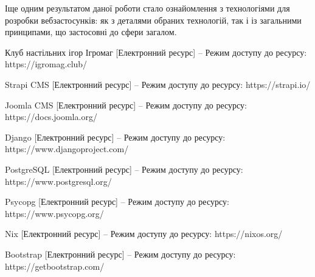 \documentclass[a4paper, 14pt]{extarticle}
\begin{document}
  Іще одним результатом даної роботи стало ознайомлення з технологіями для
  розробки вебзастосунків: як з деталями обраних технологій, так і із загальними принципами,
  що застосовні до сфери загалом.

  \clearpage
  \begin{thebibliography}{9}
     Клуб настільних ігор Ігромаг [Електронний ресурс]
    -- Режим доступу до ресурсу:
    https://igromag.club/

     Strapi CMS [Електронний ресурс] -- Режим доступу до ресурсу:
    https://strapi.io/

     Joomla CMS [Електронний ресурс] -- Режим доступу до ресурсу:
    https://docs.joomla.org/

     Django [Електронний ресурс] -- Режим доступу до ресурсу:
    https://www.djangoproject.com/

     PostgreSQL [Електронний ресурс] -- Режим доступу до ресурсу:
    https://www.postgresql.org/

     Psycopg [Електронний ресурс] -- Режим доступу до ресурсу:
    https://www.psycopg.org/

     Nix [Електронний ресурс] -- Режим доступу до ресурсу:
    https://nixos.org/

     Bootstrap [Електронний ресурс] -- Режим доступу до ресурсу:
    https://getbootstrap.com/

  \end{thebibliography}
\end{document}
